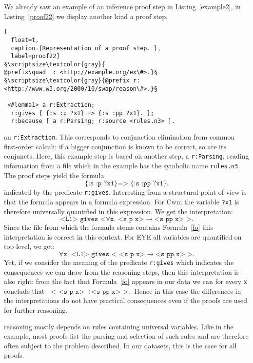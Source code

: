 We already saw an example
of an inference proof
step in Listing~\ref{example2}, in 
Listing~\ref{proof22} we display another kind a proof step,
\begin{lstlisting}[
  float=t,
  caption={Representation of a proof step. },
  label=proof22]
§\scriptsize\textcolor{gray}{
@prefix\quad  : <http://example.org/ex\#>.}§
§\scriptsize\textcolor{gray}{@prefix r: <http://www.w3.org/2000/10/swap/reason\#>.}§

 <#lemma1> a r:Extraction;
  r:gives { {:s :p ?x1} => {:s :pp ?x1}. };
  r:because [ a r:Parsing; r:source <rules.n3> ].
\end{lstlisting}
% 
an \texttt{r:Extraction}. This corresponds to conjunction elimination from common first-order calculi: 
if a bigger conjunction is known 
to be correct, so are its conjuncts. %
Here, this example step 
is based on another step, a \texttt{r:Parsing}, \ie reading information from a file which in the example has the symbolic name \texttt{rules.n3}.
The proof steps yield the formula \begin{equation}\texttt{\{:s :p ?x1\} => \{:s :pp ?x1\}.}\label{fo}\end{equation} indicated by the predicate \texttt{r:gives}. 
Interesting from a structural point of view is  
that the formula appears in a formula expression.  For Cwm the variable \texttt{?x1} is therefore universally quantified in this expression. We get the interpretation:
\[
 \texttt{<L1> gives <}\forall \texttt{x. <s p x>}\rightarrow\texttt{<s pp x> >.}
\]
Since the file from which the formula stems contains Formula~\ref{fo} this interpretation is correct in this context. For 
EYE all variables are quantified on top level,  we get: %
\[
\forall \texttt{x. <L1> gives < <s p x>}\rightarrow\texttt{<s pp x> >.}
\]
Yet, if we consider the meaning of the predicate \texttt{r:gives} which indicates the consequences we can draw from the reasoning steps, then this interpretation is also right:
from the fact that Formula~\ref{fo} appears in our data we can for every \texttt{x} conclude that $\texttt{ < <s p x>}\rightarrow\texttt{<s pp x> >.}$ 
Hence in this case the differences 
in the interpretations do not have practical consequences even if the proofs are used for further reasoning.

\nthree reasoning mostly depends on rules containing universal variables. Like in the example, most proofs list the parsing and selection of such rules and 
are therefore often
subject to the problem described. In our datasets, this is the case for all proofs. 

